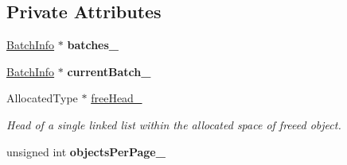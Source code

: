 \subsection*{Private Attributes}
\begin{DoxyCompactItemize}
\item 
\hypertarget{class_json_1_1_batch_allocator_ab96f6d89d8754359cdb59587d8eed5b5}{\hyperlink{struct_json_1_1_batch_allocator_1_1_batch_info}{Batch\-Info} $\ast$ {\bfseries batches\-\_\-}}\label{class_json_1_1_batch_allocator_ab96f6d89d8754359cdb59587d8eed5b5}

\item 
\hypertarget{class_json_1_1_batch_allocator_af300cf30cc086974f34effcc893e8dea}{\hyperlink{struct_json_1_1_batch_allocator_1_1_batch_info}{Batch\-Info} $\ast$ {\bfseries current\-Batch\-\_\-}}\label{class_json_1_1_batch_allocator_af300cf30cc086974f34effcc893e8dea}

\item 
\hypertarget{class_json_1_1_batch_allocator_a7532989b88c9f124f83394f24737378a}{Allocated\-Type $\ast$ \hyperlink{class_json_1_1_batch_allocator_a7532989b88c9f124f83394f24737378a}{free\-Head\-\_\-}}\label{class_json_1_1_batch_allocator_a7532989b88c9f124f83394f24737378a}

\begin{DoxyCompactList}\small\item\em Head of a single linked list within the allocated space of freeed object. \end{DoxyCompactList}\item 
\hypertarget{class_json_1_1_batch_allocator_aa7a906cb96f6c92cb06f519b15539a5c}{unsigned int {\bfseries objects\-Per\-Page\-\_\-}}\label{class_json_1_1_batch_allocator_aa7a906cb96f6c92cb06f519b15539a5c}

\end{DoxyCompactItemize}


